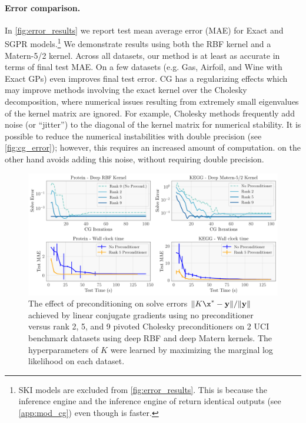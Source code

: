 \paragraph{Error comparison.}
In \autoref{fig:error_results} we report test mean average error (MAE) for Exact and SGPR models.\footnote{
  SKI models are excluded from \autoref{fig:error_results}.
  This is because the \mmacro{} inference engine and the inference engine of \citet{dong2017scalable} return identical outputs (see \autoref{app:mod_cg}) even though \mmacro{} is faster.
}
We demonstrate results using both the RBF kernel and a Matern-5/2 kernel.
Across all datasets, our method is at least as accurate in terms of final test MAE.
On a few datasets (e.g. Gas, Airfoil, and Wine with Exact GPs) \mmacro{} even improves final test error.
CG has a regularizing effects which may improve methods involving the exact kernel over the Cholesky decomposition, where numerical issues resulting from extremely small eigenvalues of the kernel matrix are ignored.
For example, Cholesky methods frequently add noise (or ``jitter'') to the diagonal of the kernel matrix for numerical stability.
It is possible to reduce the numerical instabilities with double precision (see \autoref{fig:cg_error}); however, this requires an increased amount of computation.
\mmacro{} on the other hand avoids adding this noise, without requiring double precision.

\begin{figure}[t]
  \centering
  \includegraphics[width=\textwidth]{chapters/bbmm/figures/precond_solves}
  \caption{
    The effect of preconditioning on solve errors $\Vert K\x^{*} - \by \Vert / \Vert \by \Vert$ achieved by linear conjugate gradients using no preconditioner versus rank 2, 5, and 9 pivoted Cholesky preconditioners on 2 UCI benchmark datasets using deep RBF and deep Matern kernels.
    The hyperparameters of $K$ were learned by maximizing the marginal log likelihood on each dataset.
  }
  \label{fig:precond_results}
\end{figure}

